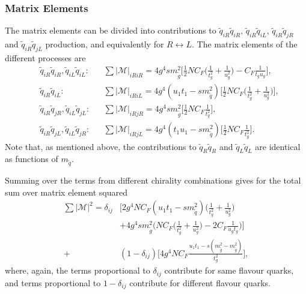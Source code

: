 \documentclass[twoside,english]{uiofysmaster}
\begin{document}
{\subsubsection{Matrix Elements}\label{Sec:: susy hadron : Matrix Elements}

The matrix elements can be divided into contributions to $\widetilde{q}_{iR} \widetilde{q}_{iR}$, $\widetilde{q}_{iR} \widetilde{q}_{iL}$, $\widetilde{q}_{iR} \widetilde{q}_{jR}$ and $\widetilde{q}_{iR} \widetilde{q}_{jL}$ production, and equivalently for $R \leftrightarrow L$. The matrix elements of the different processes are
\begin{align}
&\widetilde{q}_{iR} \widetilde{q}_{iR}, \widetilde{q}_{iL} \widetilde{q}_{iL}: && \sum |\mathcal{M}|_{iRiR} = 4g^4 s m_{\widetilde{g}}^2 \Big[ \frac{1}{2} NC_F\Big( \frac{1}{t_g^2} + \frac{1}{u_g^2} \Big) - C_F \frac{1}{t_gu_g} \Big],\\
&\widetilde{q}_{iR} \widetilde{q}_{iL}: &&\sum |\mathcal{M}|_{iRiL}=  4 g^4 (u_1t_1 - sm_{\widetilde{q}}^2) \Big[ \frac{1}{2}NC_F \Big( \frac{1}{t_g^2} + \frac{1}{u_g^2} \Big) \Big],\\
& \widetilde{q}_{iR} \widetilde{q}_{jR}, \widetilde{q}_{iL} \widetilde{q}_{jL}: && \sum |\mathcal{M}|_{iRjR} = 4 g^4 sm_{\widetilde{g}}^2 \Big[\frac{1}{2} NC_F \frac{1}{t_g^2}  \Big],\\
& \widetilde{q}_{iR} \widetilde{q}_{jL}, \widetilde{q}_{iL} \widetilde{q}_{jR}: && \sum |\mathcal{M}|_{iRjL} = 4 g^4 (t_1u_1 - sm_{\widetilde{q}}^2) \Big[\frac{1}{2} NC_F \frac{1}{t_g^2}  \Big].
\end{align}
Note that, as mentioned above, the contributions to $\widetilde{q}_R\widetilde{q}_R$ and $\widetilde{q}_L\widetilde{q}_L$ are identical as functions of $m_{\widetilde{q}}$.

Summing over the terms from different chirality combinations gives  for the total sum over matrix element squared 
\begin{align}
\sum |\mathcal{M}|^2 = \delta_{ij} & \Bigg[2 g^4NC_F(u_1t_1-sm_{\widetilde{q}}^2) \Big( \frac{1}{t_g^2} + \frac{1}{u_g^2} \Big) \nonumber \\& + 4 g^4 sm_{\widetilde{g}}^2 \Big( NC_F \Big(\frac{1}{t_g^2} + \frac{1}{u_g^2}\Big) -2C_F\frac{1}{u_gt_g} \Big) \Bigg] \nonumber \\
+& (1-\delta_{ij})\Bigg[4g^4NC_F  \frac{u_1t_1-s(m_{\widetilde{g}}^2-m_{\widetilde{g}}^2)}{t_g^2} \Bigg],
\end{align}
where, again, the terms proportional to $\delta_{ij}$ contribute for same flavour quarks, and terms proportional to $1-\delta_{ij}$ contribute for different flavour quarks.


}
\end{document}
